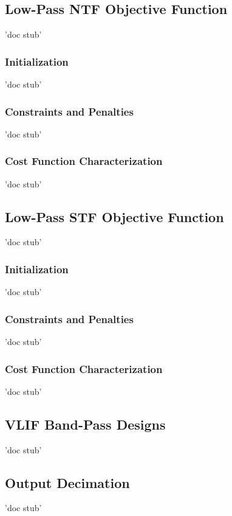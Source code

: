 \subsection{Low-Pass NTF Objective Function}'doc stub'
\subsubsection{Initialization}'doc stub'
\subsubsection{Constraints and Penalties}'doc stub'
\subsubsection{Cost Function Characterization}'doc stub'

\subsection{Low-Pass STF Objective Function}'doc stub'
\subsubsection{Initialization}'doc stub'
\subsubsection{Constraints and Penalties}'doc stub'
\subsubsection{Cost Function Characterization}'doc stub'

\subsection{VLIF Band-Pass Designs}
'doc stub'

\subsection{Output Decimation}
'doc stub'


